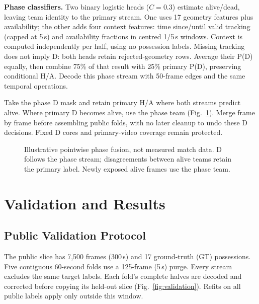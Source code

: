 \documentclass[conference,a4paper,10pt]{IEEEtran}
\begin{document}
\textbf{Phase classifiers.} Two binary logistic heads ($C=0.3$) estimate
alive/dead, leaving team identity to the primary stream. One uses 17 geometry
features plus availability; the other adds four context features: time since/until
valid tracking (capped at 5\,s) and availability fractions in centred 1/5\,s
windows. Context is computed independently per half, using no possession labels.
Missing tracking does not imply D: both heads retain rejected-geometry rows.
Average their P(D) equally, then combine
75\% of that result with 25\% primary P(D), preserving conditional H/A. Decode
this phase stream with 50-frame edges and the same temporal operations.

Take the phase D mask and retain primary H/A where both streams predict alive.
Where primary D becomes alive, use the phase team (Fig.~\ref{fig:phase}). Merge
frame by frame before assembling public folds, with no later cleanup to undo these
D decisions. Fixed D cores and primary-video coverage remain protected.

\begin{figure}[!t]
\centering
{}
\caption{Illustrative pointwise phase fusion, not measured match data. D follows
the phase stream; disagreements between alive teams retain the primary label.
Newly exposed alive frames use the phase team.}
\label{fig:phase}
\end{figure}

\section{Validation and Results}
\subsection{Public Validation Protocol}
The public slice has 7,500 frames (300\,s) and 17 ground-truth (GT) possessions. Five contiguous
60-second folds use a 125-frame (5\,s) purge. Every stream excludes the same target labels. Each fold's complete halves are
decoded and corrected before copying its held-out slice (Fig.~\ref{fig:validation}).
Refits on all public labels apply only outside this window.
\end{document}
